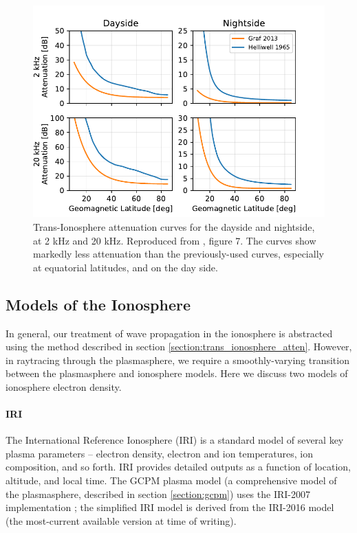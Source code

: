 
\begin{figure}[h]
\begin{center}
\includegraphics{figures/iono_absorp_curves}
\caption[Trans-Ionosphere attenuation curves for day and night]{Trans-Ionosphere attenuation curves for the dayside and nightside, at 2 kHz and 20 kHz. Reproduced from \cite{Graf2013}, figure 7. The \citeauthor{Graf2013} curves show markedly less attenuation than the previously-used \citeauthor{Helliwell1965} curves, especially at equatorial latitudes, and on the day side.}
\label{fig:graf_curves}
\end{center}
\end{figure}


\subsection{Models of the Ionosphere}
In general, our treatment of wave propagation in the ionosphere is abstracted using the method described in section \ref{section:trans_ionosphere_atten}. However, in raytracing through the plasmasphere, we require a smoothly-varying transition between the plasmasphere and ionosphere models. Here we discuss two models of ionosphere electron density.

\paragraph{IRI}
The International Reference Ionosphere (IRI) is a standard model of several key plasma parameters -- electron density, electron and ion temperatures, ion composition, and so forth. IRI provides detailed outputs as a function of location, altitude, and local time. The GCPM plasma model (a comprehensive model of the plasmasphere, described in section \ref{section:gcpm}) uses the IRI-2007 implementation \citep{Bilitza2008}; the simplified IRI model is derived from the IRI-2016 model (the most-current available version at time of writing).


